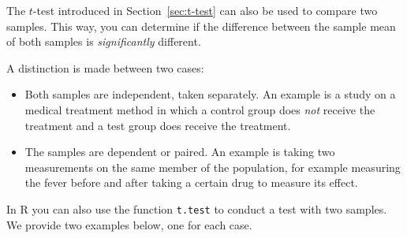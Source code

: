 The $t$-test introduced in Section~\ref{sec:t-test} can also be used to compare two samples. This way, you can determine if the difference between the sample mean of both samples is \emph{significantly} different.

A distinction is made between two cases:

\begin{itemize}
  \item Both samples are independent, taken separately. An example is a study on a medical treatment method in which a control group does \emph{not} receive the treatment and a test group does receive the treatment.
  \item The samples are dependent or paired. An example is taking two measurements on the same member of the population, for example measuring the fever before and after taking a certain drug to measure its effect.
\end{itemize}

In R you can also use the function \texttt{t.test} to conduct a test with two samples. We provide two examples below, one for each case.

